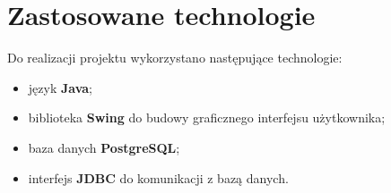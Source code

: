 \section{Zastosowane technologie}

Do realizacji projektu wykorzystano następujące technologie:

\begin{itemize}
    \item język \textbf{Java};
    \item biblioteka \textbf{Swing} do budowy graficznego interfejsu użytkownika;
    \item baza danych \textbf{PostgreSQL};
    \item interfejs \textbf{JDBC} do komunikacji z bazą danych.
\end{itemize}
